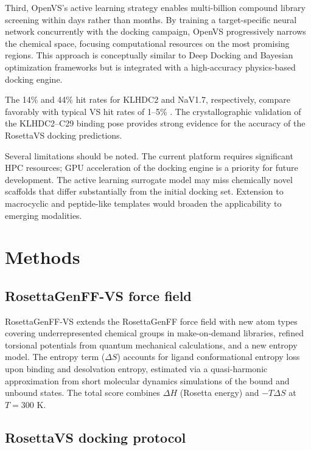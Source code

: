 \documentclass[11pt]{article}
\begin{document}
Third, OpenVS's active learning strategy enables multi-billion compound library screening within days rather than months. By training a target-specific neural network concurrently with the docking campaign, OpenVS progressively narrows the chemical space, focusing computational resources on the most promising regions. This approach is conceptually similar to Deep Docking \citep{gentile2020} and Bayesian optimization frameworks \citep{graff2021} but is integrated with a high-accuracy physics-based docking engine.

The 14\% and 44\% hit rates for KLHDC2 and NaV1.7, respectively, compare favorably with typical VS hit rates of 1--5\% \citep{shoichet2004}. The crystallographic validation of the KLHDC2--C29 binding pose provides strong evidence for the accuracy of the RosettaVS docking predictions.

Several limitations should be noted. The current platform requires significant HPC resources; GPU acceleration of the docking engine is a priority for future development. The active learning surrogate model may miss chemically novel scaffolds that differ substantially from the initial docking set. Extension to macrocyclic and peptide-like templates would broaden the applicability to emerging modalities.

\section{Methods}

\subsection{RosettaGenFF-VS force field}

RosettaGenFF-VS extends the RosettaGenFF force field \citep{park2021} with new atom types covering underrepresented chemical groups in make-on-demand libraries, refined torsional potentials from quantum mechanical calculations, and a new entropy model. The entropy term ($\Delta S$) accounts for ligand conformational entropy loss upon binding and desolvation entropy, estimated via a quasi-harmonic approximation from short molecular dynamics simulations of the bound and unbound states. The total score combines $\Delta H$ (Rosetta energy) and $-T\Delta S$ at $T = 300$ K.

\subsection{RosettaVS docking protocol}
\end{document}
